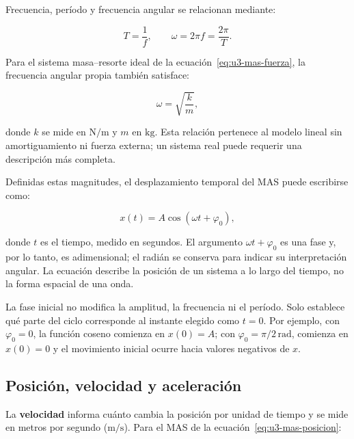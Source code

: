 Frecuencia, período y frecuencia angular se relacionan mediante:

\begin{equation}
    T=\frac{1}{f},
    \qquad
    \omega=2\pi f=\frac{2\pi}{T}.
    \label{eq:u3-f-t-omega}
\end{equation}

Para el sistema masa--resorte ideal de la
ecuación~\eqref{eq:u3-mas-fuerza}, la frecuencia angular propia también
satisface:

\begin{equation}
    \omega=\sqrt{\frac{k}{m}},
    \label{eq:u3-omega-masa-resorte}
\end{equation}

donde \(k\) se mide en \(\text{N}/\text{m}\) y \(m\) en
\(\text{kg}\). Esta relación pertenece al modelo lineal sin amortiguamiento
ni fuerza externa; un sistema real puede requerir una descripción más
completa.

Definidas estas magnitudes, el desplazamiento temporal del MAS puede
escribirse como:

\begin{equation}
    x(t)=A\cos\left(\omega t+\varphi_0\right),
    \label{eq:u3-mas-posicion}
\end{equation}

donde \(t\) es el tiempo, medido en segundos. El argumento
\(\omega t+\varphi_0\) es una fase y, por lo tanto, es adimensional; el radián
se conserva para indicar su interpretación angular. La ecuación describe la
posición de un sistema a lo largo del tiempo, no la forma espacial de una
onda.

La fase inicial no modifica la amplitud, la frecuencia ni el período. Solo
establece qué parte del ciclo corresponde al instante elegido como
\(t=0\). Por ejemplo, con \(\varphi_0=0\), la función coseno comienza en
\(x(0)=A\); con \(\varphi_0=\pi/2\,\text{rad}\), comienza en \(x(0)=0\) y el
movimiento inicial ocurre hacia valores negativos de \(x\).

\subsection{Posición, velocidad y aceleración}
\label{sec:u3-posicion-velocidad-aceleracion}

La \textbf{velocidad} informa cuánto cambia la posición por unidad de tiempo y
se mide en metros por segundo (\(\text{m}/\text{s}\)). Para el MAS de la
ecuación~\eqref{eq:u3-mas-posicion}:

